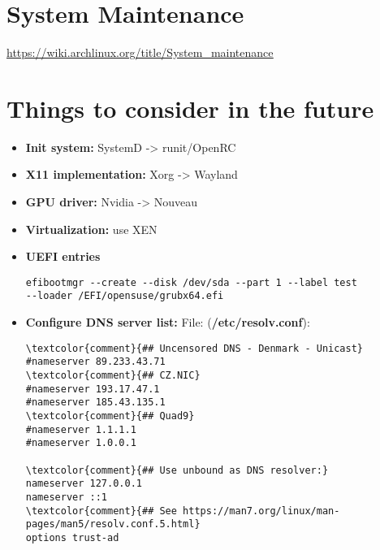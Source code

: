 \documentclass[10pt, a4paper, onecolumn, openany]{book} %
\begin{document}
\chapter{System Maintenance}
\underline{\href{https://wiki.archlinux.org/title/System\_maintenance}{https://wiki.archlinux.org/title/System\_maintenance}}


\chapter{Things to consider in the future}
\begin{itemize}
    \item \textbf{Init system:} SystemD -> runit/OpenRC
    \item \textbf{X11 implementation:} Xorg -> Wayland
    \item \textbf{GPU driver:} Nvidia -> Nouveau
    \item \textbf{Virtualization:} use XEN
    \item \textbf{UEFI entries}
\begin{Verbatim}[commandchars=\\\{\}]
efibootmgr --create --disk /dev/sda --part 1 --label test 
--loader /EFI/opensuse/grubx64.efi    
\end{Verbatim}
    
    
        \item \textbf{Configure DNS server list:}
\newline File: (\textbf{\textcolor{file}{/etc/resolv.conf}}):
\begin{Verbatim}[commandchars=\\\{\}]
\textcolor{comment}{## Uncensored DNS - Denmark - Unicast}
#nameserver 89.233.43.71
\textcolor{comment}{## CZ.NIC}
#nameserver 193.17.47.1
#nameserver 185.43.135.1
\textcolor{comment}{## Quad9}
#nameserver 1.1.1.1
#nameserver 1.0.0.1

\textcolor{comment}{## Use unbound as DNS resolver:}
nameserver 127.0.0.1
nameserver ::1
\textcolor{comment}{## See https://man7.org/linux/man-pages/man5/resolv.conf.5.html}
options trust-ad
\end{Verbatim}
    
\end{itemize}
\end{document}
